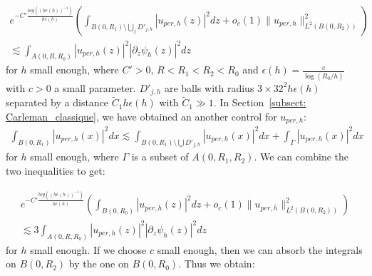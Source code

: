 \documentclass[leqno,11pt,letterpaper, english]{amsart}
\theoremstyle{plain}
\theoremstyle{definition}
\numberwithin{equation}{section}
\begin{document}
\begin{itemize}
\begin{multline}
	e^{-C'  \frac{log((h\epsilon(h))^{-1})}{h\epsilon(h)}}\left(\int_{B(0,R_1)\setminus \bigcup_j D'_{j,h}} |u_{per,h}(z)|^2 dz+ o_c(1) \|u_{per,h}\|_{L^2(B(0,R_2))}^2 \right) \\
	\lesssim \int_{A(0,R,R_0)} \left|u_{per,h}(z)\right|^2\left|\partial_z \psi_h\left(z\right)\right|^2dz
\end{multline}
for $h$ small enough, where $ C' > 0$, $R<R_1<R_2<R_0$ and $\epsilon(h)=\frac{c}{\log(R_0/h)}$ with $c>0$ a small parameter. $D'_{j,h}$ are balls with radius $3 \times 32^2 h\epsilon(h)$ separated by a distance $\tilde{C}_1 h\epsilon(h)$ with $\tilde{C}_1 \gg 1$.  In Section~\ref{subsect: Carleman_classique}, we have obtained an another control for $u_{per,h}$: 
\begin{align}
	\int_{B(0,R_1)} | u_{per,h}(x)|^2 dx \lesssim  \int_{B(0,R_1)\setminus \bigcup D'_{j,h}} | u_{per,h}(x)|^2 dx +  \int_{\Gamma}  |u_{per,h}(x)|^2 dx
\end{align}
for $h$ small enough, where $\Gamma$ is a subset of $A(0, R_1,R_2)$.
We can combine the two inequalities to get: 

\begin{multline}
	e^{-C'  \frac{log((h\epsilon(h))^{-1})}{h\epsilon(h)}}\left(\int_{B(0,R_0)} |u_{per,h}(z)|^2 dz+ o_c(1) \|u_{per,h}\|_{L^2(B(0,R_2))}^2 \right) \\
\lesssim 3\int_{A(0,R,R_0)} \left|u_{per,h}(z)\right|^2\left|\partial_z \psi_h\left(z\right)\right|^2dz
\end{multline}
for $h$ small enough.
If we choose $c$ small enough, then we can absorb the integrals on $B(0,R_2)$ by the one on $B(0,R_0)$. Thus we obtain:


\end{itemize}
\end{document}
